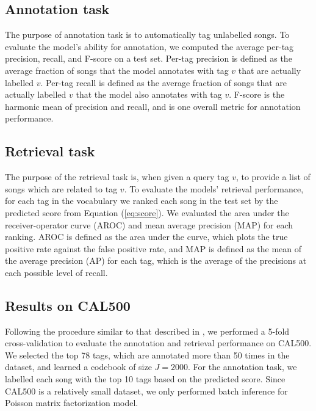 \subsection{Annotation task}
The purpose of annotation task is to automatically tag unlabelled songs. To evaluate the model's ability for annotation, we computed the average per-tag precision, recall, and F-score on a test set. Per-tag precision is defined as the average fraction of songs that the model annotates with tag $v$ that are actually labelled $v$. Per-tag recall is defined as the average fraction of songs that are actually labelled $v$ that the model also annotates with tag $v$. F-score is the harmonic mean of precision and recall, and is one overall metric for annotation performance.


\subsection{Retrieval task}
The purpose of the retrieval task is, when given a query tag $v$, to provide a list of songs which are related to tag $v$. To evaluate the models' retrieval performance, for each tag in the vocabulary we ranked each song in the test set by the predicted score from Equation (\ref{eq:score}). We evaluated the area under the receiver-operator curve (AROC) and mean average precision (MAP) for each ranking. AROC is defined as the area under the curve, which plots the true positive rate against the false positive rate, and MAP is defined as the mean of the average precision (AP) for each tag, which is the average of the precisions at each possible level of recall. 

\subsection{Results on CAL500}
Following the procedure similar to that described in \cite{hoffman2009easy, xie2011music}, we performed a 5-fold cross-validation to evaluate the annotation and retrieval performance on CAL500. We selected the top 78 tags, which are annotated more than 50 times in the dataset, and learned a codebook of size $J = 2000$. For the annotation task, we labelled each song with the top 10 tags based on the predicted score. Since CAL500 is a relatively small dataset, we only performed batch inference for Poisson matrix factorization model.

